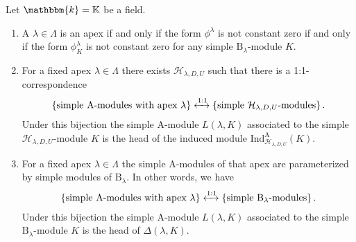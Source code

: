\documentclass[a4paper,11pt]{amsart}
\newcommand{\setstuff}[1]{\mathrm{#1}}
\newcommand{\K}{\mathbb{K}}
\newcommand{\KK}{\mathbbm{k}}
\numberwithin{equation}{section}
\begin{document}
\begin{theorem}\label{theorem:classification}
Let $\KK=\K$ be a field.
\begin{enumerate}

\item A $\lambda\in\Lambda$ is an apex if and 
only if the form $\phi^{\lambda}$ is not constant zero 
if and only if the form $\phi^{\lambda}_{K}$ is not constant zero 
for any simple $\setstuff{B}_{\lambda}$-module $K$.

\item For a fixed apex $\lambda\in\Lambda$ there exists 
$\mathcal{H}_{\lambda,D,U}$ such that there is a 1:1-correspondence
\begin{gather*}
\left\{
\text{simple $\setstuff{A}$-modules with apex $\lambda$}
\right\}
\xleftrightarrow{1:1}
\left\{
\text{simple $\mathcal{H}_{\lambda,D,U}$-modules}
\right\}
.
\end{gather*}	
Under this bijection the 
simple $\setstuff{A}$-module $L(\lambda,K)$ 
associated to the simple $\mathcal{H}_{\lambda,D,U}$-module $K$
is the head of the induced module 
$\mathrm{Ind}_{\mathcal{H}_{\lambda,D,U}}^{\setstuff{A}}(K)$.

\item For a fixed apex $\lambda\in\Lambda$
the simple $\setstuff{A}$-modules of that apex are 
parameterized by simple 
modules of $\setstuff{B}_{\lambda}$. In other words, we have
\begin{gather*}
\left\{
\text{simple $\setstuff{A}$-modules with apex $\lambda$}
\right\}
\xleftrightarrow{1:1}
\left\{
\text{simple $\setstuff{B}_{\lambda}$-modules}
\right\}
.
\end{gather*}
Under this bijection the 
simple $\setstuff{A}$-module $L(\lambda,K)$ 
associated to the simple $\setstuff{B}_{\lambda}$-module $K$
is the head of
$\Delta(\lambda,K)$.

\end{enumerate}
\end{theorem}
\end{document}
